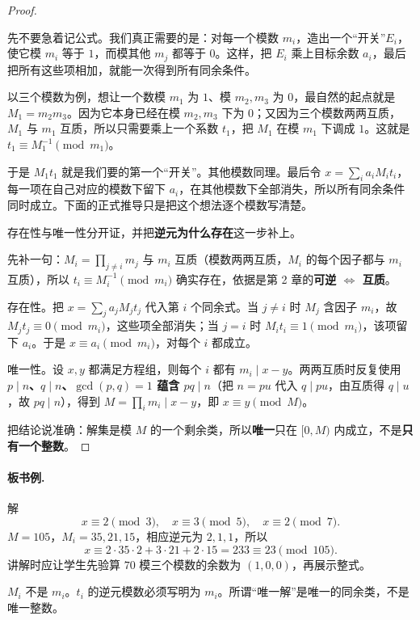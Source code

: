\documentclass[UTF8,a4paper,11pt,twoside,openright,fontset=fandol]{ctexbook}
\theoremstyle{definition}
\begin{document}
\begin{proof}
\begin{tip}
先不要急着记公式。我们真正需要的是：对每一个模数 $m_i$，造出一个“开关”$E_i$，使它模 $m_i$ 等于 $1$，而模其他 $m_j$ 都等于 $0$。这样，把 $E_i$ 乘上目标余数 $a_i$，最后把所有这些项相加，就能一次得到所有同余条件。

以三个模数为例，想让一个数模 $m_1$ 为 $1$、模 $m_2,m_3$ 为 $0$，最自然的起点就是 $M_1=m_2m_3$。因为它本身已经在模 $m_2,m_3$ 下为 $0$；又因为三个模数两两互质，$M_1$ 与 $m_1$ 互质，所以只需要乘上一个系数 $t_1$，把 $M_1$ 在模 $m_1$ 下调成 $1$。这就是 $t_1\equiv M_1^{-1}\pmod{m_1}$。

于是 $M_1t_1$ 就是我们要的第一个“开关”。其他模数同理。最后令 $x=\sum_i a_iM_it_i$，每一项在自己对应的模数下留下 $a_i$，在其他模数下全部消失，所以所有同余条件同时成立。下面的正式推导只是把这个想法逐个模数写清楚。
\end{tip}
存在性与唯一性分开证，并把\textbf{逆元为什么存在}这一步补上。

先补一句：$M_i=\prod_{j\ne i}m_j$ 与 $m_i$ 互质（模数两两互质，$M_i$ 的每个因子都与 $m_i$ 互质），所以 $t_i\equiv M_i^{-1}\pmod{m_i}$ 确实存在，依据是第 2 章的\textbf{可逆 $\iff$ 互质}。

存在性。把 $x=\sum_j a_jM_jt_j$ 代入第 $i$ 个同余式。当 $j\ne i$ 时 $M_j$ 含因子 $m_i$，故 $M_jt_j\equiv0\pmod{m_i}$，这些项全部消失；当 $j=i$ 时 $M_it_i\equiv1\pmod{m_i}$，该项留下 $a_i$。于是 $x\equiv a_i\pmod{m_i}$，对每个 $i$ 都成立。

唯一性。设 $x,y$ 都满足方程组，则每个 $i$ 都有 $m_i\mid x-y$。两两互质时反复使用\textbf{$p\mid n$、$q\mid n$、$\gcd(p,q)=1$ 蕴含 $pq\mid n$}（把 $n=pu$ 代入 $q\mid pu$，由互质得 $q\mid u$，故 $pq\mid n$），得到 $M=\prod_i m_i\mid x-y$，即 $x\equiv y\pmod M$。

把结论说准确：解集是模 $M$ 的一个剩余类，所以\textbf{唯一}只在 $[0,M)$ 内成立，不是\textbf{只有一个整数}。
\end{proof}

\paragraph{板书例.} 解
\[
 x\equiv2\pmod3,\quad x\equiv3\pmod5,\quad x\equiv2\pmod7.
\]
$M=105$，$M_i=35,21,15$，相应逆元为 $2,1,1$，所以
\[
 x\equiv2\cdot35\cdot2+3\cdot21+2\cdot15=233\equiv23\pmod{105}.
\]
讲解时应让学生先验算 $70$ 模三个模数的余数为 $(1,0,0)$，再展示整式。
\begin{pitfall}
$M_i$ 不是 $m_i$。$t_i$ 的逆元模数必须写明为 $m_i$。所谓“唯一解”是唯一的同余类，不是唯一整数。
\end{pitfall}
\end{document}
